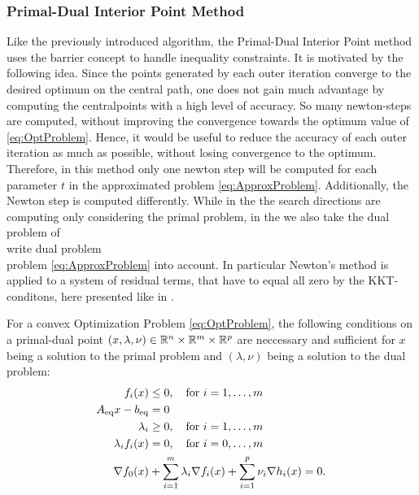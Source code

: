 \subsubsection{Primal-Dual Interior Point Method}
Like the previously introduced algorithm, the Primal-Dual Interior Point method uses the barrier concept to handle inequality constraints. It is motivated by the following idea. Since the points generated by each outer iteration converge to the desired optimum on the central path, one does not gain much advantage by computing the centralpoints with a high level of accuracy. So many newton-steps are computed, without improving the convergence towards the optimum value of \eqref{eq:OptProblem}. Hence, it would be useful to reduce the accuracy of each outer iteration as much as possible, without losing convergence to the optimum. Therefore, in this method only one newton step will be computed for each parameter $ t $ in the approximated problem  \eqref{eq:ApproxProblem}. Additionally, the Newton step is computed differently. While in the the search directions are computing only considering the primal problem, in the \pdm we also take the dual problem of\\
\todo write dual problem\\
problem \eqref{eq:ApproxProblem} into account. In particular Newton's method is applied to a system of residual terms, that have to equal all zero by the KKT-conditons, here presented like in \cite{BV}.  \\
\begin{theorem}
	For a convex Optimization Problem \eqref{eq:OptProblem}, the following conditions on a primal-dual point $ (x,\lambda,\nu) \in \mathbb{R}^n \times \mathbb{R}^m \times \mathbb{R}^p$ are neccessary and sufficient for $ x $ being a solution to the primal problem and $ (\lambda, \nu) $ being a solution to the dual problem:
	\begin{subequations}
			\begin{align}
		f_i(x) &\leq 0, \quad \text{for } i = 1,\dots,m\\
		{A}_{\mathrm{eq}} x - {b}_{\mathrm{eq}} &= 0\\
		\lambda_i &\geq 0,  \quad \text{for } i = 1,\dots,m\\
		\lambda_i f_i(x) & = 0, \quad \text{for } i = 0, \dots,m\\
		\nabla f_0(x) &+ \sum_{i=1}^{m} \lambda_i \nabla f_i(x) + \sum_{i=1}^{p} \nu_i \nabla h_i (x) = 0.
		\end{align}
	\end{subequations}
\end{theorem}

